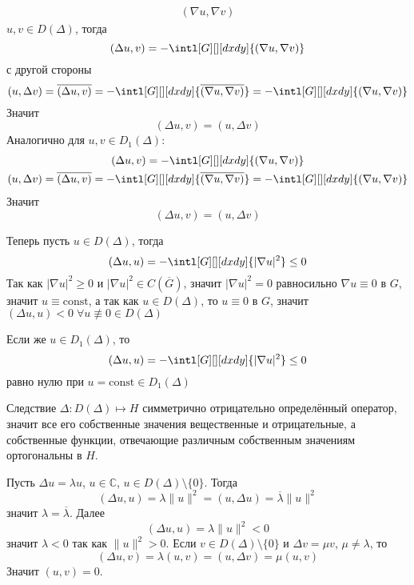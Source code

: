 \documentclass[14pt]{extarticle}
\begin{document}
\begin{Proof}
\begin{multline*}
    {(\nabla u, \nabla v)}
    \end{multline*}
    $u, v \in D(\Delta)$, тогда
    $$
    (\Delta u, v) = -\intl[G][][dxdy]{(\nabla u, \nabla v)}
    $$
    с другой стороны
    $$
    (u, \Delta v) = \overline{(\Delta u, v)} = -\intl[G][][dxdy]{\overline{(\nabla u, \nabla v)}} = -
    \intl[G][][dxdy]{(\nabla u, \nabla v)}
    $$
    Значит
    $$
    (\Delta u, v) = (u, \Delta v)
    $$
    Аналогично для $u, v \in D_1(\Delta)$:
    \begin{gather*}
        (\Delta u, v) = -\intl[G][][dxdy]{(\nabla u, \nabla v)}\\
        (u, \Delta v) = \overline{(\Delta u, v)} = -\intl[G][][dxdy]{\overline{(\nabla u, \nabla v)}} = -
        \intl[G][][dxdy]{(\nabla u, \nabla v)}
    \end{gather*}
    Значит
    $$
    (\Delta u, v) = (u, \Delta v)
    $$
    
    Теперь пусть $u \in D(\Delta)$, тогда
    $$
    (\Delta u, u) = - \intl[G][][dxdy]{|\nabla u|^2} \le 0
    $$
    Так как $|\nabla u|^2 \ge 0$ и $|\nabla u|^2 \in C(\overline{G})$, значит $|\nabla u|^2 = 0$
    равносильно $\nabla u \equiv 0$ в $G$, значит $u \equiv \mathrm{const}$, а так как
    $u \in D(\Delta)$, то $u \equiv 0$ в $G$, значит $(\Delta u, u) < 0\; \forall u \not \equiv 0 \in 
    D(\Delta)$

    Если же $u \in D_1(\Delta)$, то
    $$
    (\Delta u, u) = - \intl[G][][dxdy]{|\nabla u|^2} \le 0
    $$
    равно нулю при $u = \mathrm{const} \in D_1(\Delta)$
\end{Proof}
\begin{MathCl}{Следствие}
    $\Delta : D(\Delta) \mapsto H$ симметрично отрицательно определённый оператор,
    значит все его собственные значения вещественные и отрицательные, а собственные
    функции, отвечающие различным собственным значениям ортогональны в $H$.
\end{MathCl}
\begin{Proof}
    Пусть $\Delta u = \lambda u$, $u \in \mathbb C$, $u \in D(\Delta)\setminus\{0\}$.
    Тогда
    $$
    (\Delta u, u) = \lambda \|u\|^2 = (u, \Delta u) = \overline{\lambda} \|u\|^2
    $$
     значит $\lambda = \overline{\lambda}$.
     Далее
     $$
     (\Delta u, u) = \lambda\|u\|^2 < 0
     $$
     значит $\lambda < 0$ так как $\|u\|^2 > 0$.
     Если $v \in D(\Delta) \setminus \{0\}$ и $\Delta v = \mu v$, $\mu \ne \lambda$, то
     $$
     (\Delta u, v) = \lambda (u, v) = (u, \Delta v) = \mu(u, v)
    $$
    Значит $(u, v) = 0$.
\end{Proof}
\end{document}
